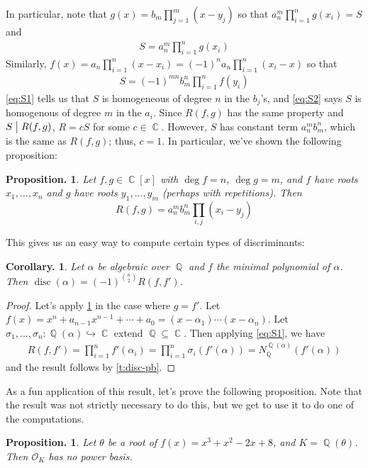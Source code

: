 \documentclass[11pt, a4paper]{memoir}
\DeclareMathOperator{\Q}{{\mathbb{Q}}}
\DeclareMathOperator{\C}{{\mathbb{C}}}
\newcommand{\hto}[0]{\ensuremath{\hookrightarrow}}
\renewcommand{\div}{\bigm|}
\theoremstyle{change}
\newtheorem{corollary}[theorem]{Corollary.}
\newtheorem{proposition}[theorem]{Proposition.}
\theoremstyle{plain}
\theoremstyle{nonumberplain}
\newtheorem{proof}{Proof}
\DeclareMathOperator{\disc}{disc}
\numberwithin{equation}{section}
\begin{document}
In particular, note that $g(x)=b_m\prod_{j=1}^m(x-y_j)$ so that $a_n^m\prod_{i=1}^ng(x_i)=S$ and
\begin{align}
    S=a_n^m\prod_{i=1}^ng(x_i)\label{eq:S1}
\end{align}
Similarly, $f(x)=a_n\prod_{i=1}^n(x-x_i)=(-1)^na_n\prod_{i=1}^n(x_i-x)$ so that
\begin{align}
    S=(-1)^{mn}b_m^n\prod_{i=1}^nf(y_i)\label{eq:S2}
\end{align}
\cref{eq:S1} tells us that $S$ is homogeneous of degree $n$ in the $b_j$'s, and \cref{eq:S2} says $S$ is homogenous of degree $m$ in the $a_i$.
Since $R(f,g)$ has the same property and $S\div R(f,g)$, $R=cS$ for some $c\in\C$.
However, $S$ has constant term $a_n^mb_m^n$, which is the same as $R(f,g)$; thus, $c=1$.
In particular, we've shown the following proposition:
\begin{proposition}\label{p:res-alt}
    Let $f,g\in\C[x]$ with $\deg f=n$, $\deg g=m$, and $f$ have roots $x_1,\ldots,x_n$ and $g$ have roots $y_1,\ldots,y_m$ (perhaps with repetitions).
    Then
    \begin{equation*}
        \displaystyle R(f,g)=a_n^mb_m^n\prod_{i,j}(x_i-y_j)
    \end{equation*}
\end{proposition}
This gives us an easy way to compute certain types of discriminants:
\begin{corollary}
    Let $\alpha$ be algebraic over $\Q$ and $f$ the minimal polynomial of $\alpha$.
    Then $\disc(\alpha)=(-1)^{\binom{n}{2}}R(f,f')$.
\end{corollary}
\begin{proof}
    Let's apply \cref{p:res-alt} in the case where $g=f'$.
    Let $f(x)=x^n+a_{n-1}x^{n-1}+\cdots+a_0=(x-\alpha_1)\cdots(x-\alpha_n)$.
    Let $\sigma_1,\ldots,\sigma_n:\Q(\alpha)\hto\C$ extend $\Q\subseteq\C$.
    Then applying \cref{eq:S1}, we have
    \begin{align*}
        R(f,f')=\prod_{i=1}^n f'(\alpha_i)=\prod_{i=1}^n\sigma_i(f'(\alpha))=N_{\Q}^{\Q(\alpha)}(f'(\alpha))
    \end{align*}
    and the result follows by \cref{t:disc-pb}.
\end{proof}
As a fun application of this result, let's prove the following proposition.
Note that the result was not strictly necessary to do this, but we get to use it to do one of the computations.
\begin{proposition}
    Let $\theta$ be a root of $f(x)=x^3+x^2-2x+8$, and $K=\Q(\theta)$.
    Then $\mathcal{O}_K$ has no power basis.
\end{proposition}
\end{document}
